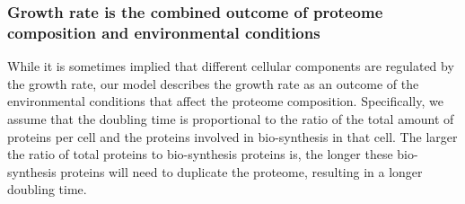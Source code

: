 \subsubsection{Growth rate is the combined outcome of proteome composition and environmental conditions}
While it is sometimes implied that different cellular components are regulated by the growth rate, our model describes the growth rate as an outcome of the environmental conditions that affect the proteome composition.
Specifically, we assume that the doubling time is proportional to the ratio of the total amount of proteins per cell and the proteins involved in bio-synthesis in that cell.
The larger the ratio of total proteins to bio-synthesis proteins is, the longer these bio-synthesis proteins will need to duplicate the proteome, resulting in a longer doubling time.